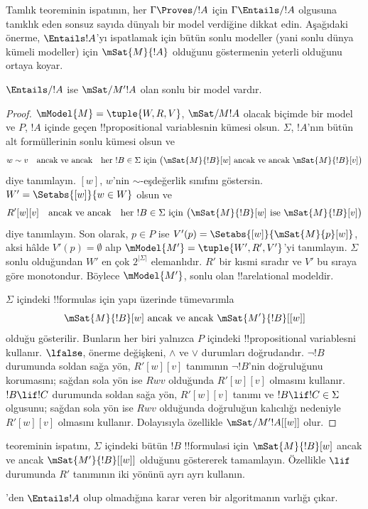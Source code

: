\documentclass[../../../include/open-logic-section]{subfiles}
\begin{document}

Tamlık teoreminin ispatının, her $\Gamma\Proves/ !A$ için
$\Gamma\Entails/ !A$ olgusuna tanıklık eden sonsuz sayıda dünyalı bir model
verdiğine dikkat edin. Aşağıdaki önerme, $\Entails !A$'yı ispatlamak için
bütün sonlu modeller (yani sonlu dünya kümeli modeller) için
$\mSat{M}{!A}$ olduğunu göstermenin yeterli olduğunu ortaya koyar.

\begin{thm}
  $\Entails/ !A$ ise $\mSat/{M'}{!A}$ olan sonlu bir model vardır.
\end{thm}

\begin{proof}
  $\mModel{M}=\tuple{W,R,V}$, $\mSat/{M}{!A}$ olacak biçimde bir model ve
  $P$, $!A$ içinde geçen !!{propositional variable}s{}nin kümesi olsun.
  $\Sigma$, $!A$'nın bütün alt formüllerinin sonlu kümesi olsun ve
  \[
    w\sim v \quad\text{ancak ve ancak}\quad
    \text{her $!B\in\Sigma$ için }
    \bigl(\mSat{M}{!B}[w]\text{ ancak ve ancak }\mSat{M}{!B}[v]\bigr)
  \]
  diye tanımlayın. $[w]$, $w$'nin $\sim$-eşdeğerlik sınıfını göstersin.
  $W'=\Setabs{[w]}{w\in W}$ olsun ve
  \[
    R'[w][v] \quad\text{ancak ve ancak}\quad
    \text{her $!B\in\Sigma$ için }
    \bigl(\mSat{M}{!B}[w]\text{ ise }\mSat{M}{!B}[v]\bigr)
  \]
  diye tanımlayın. Son olarak, $p\in P$ ise
  $V'(p)=\Setabs{[w]}{\mSat{M}{p}[w]}$, aksi hâlde $V'(p)=\emptyset$ alıp
  $\mModel{M'}=\tuple{W',R',V'}$'yi tanımlayın. $\Sigma$ sonlu olduğundan
  $W'$ en çok $2^{|\Sigma|}$ elemanlıdır. $R'$ bir kısmi sıradır ve $V'$
  bu sıraya göre monotondur. Böylece $\mModel{M'}$, sonlu olan
  !!a{relational model}{}dir.

  $\Sigma$ içindeki !!{formula}s için yapı üzerinde tümevarımla
  \[
    \mSat{M}{!B}[w] \text{ ancak ve ancak } \mSat{M'}{!B}[{[w]}]
  \]
  olduğu gösterilir. Bunların her biri yalnızca $P$ içindeki
  !!{propositional variable}s{}ni kullanır. $\lfalse$, önerme değişkeni,
  $\land$ ve $\lor$ durumları doğrudandır. $\lnot !B$ durumunda soldan sağa
  yön, $R'[w][v]$ tanımının $\lnot !B$'nin doğruluğunu korumasını; sağdan
  sola yön ise $Rwv$ olduğunda $R'[w][v]$ olmasını kullanır.
  $!B\lif !C$ durumunda
  soldan sağa yön, $R'[w][v]$ tanımı ve
  $!B\lif !C\in\Sigma$ olgusunu; sağdan sola yön ise $Rwv$ olduğunda
  doğruluğun kalıcılığı nedeniyle $R'[w][v]$ olmasını kullanır.
  Dolayısıyla özellikle $\mSat/{M'}{!A}[{[w]}]$ olur.
\end{proof}

\begin{prob}
 teoreminin ispatını, $\Sigma$
içindeki bütün $!B$ !!{formula}s{}i için
$\mSat{M}{!B}[w]$ ancak ve ancak $\mSat{M'}{!B}[{[w]}]$ olduğunu göstererek
tamamlayın. Özellikle $\lif$ durumunda $R'$ tanımının iki yönünü ayrı ayrı
kullanın.
\end{prob}

'den $\Entails !A$ olup olmadığına karar veren
bir algoritmanın varlığı çıkar.
\end{document}
